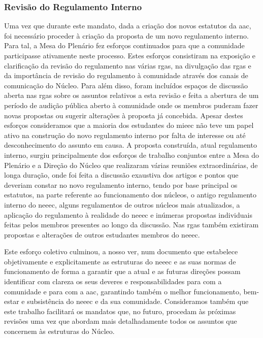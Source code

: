 
\subsubsection{Revisão do Regulamento Interno}

Uma vez que durante este mandato, dada a criação dos novos estatutos da \acrshort{aac}, foi necessário proceder à criação da proposta de um novo regulamento interno. Para tal, a Mesa do Plenário fez esforços continuados para que a comunidade participasse ativamente neste processo. Estes esforços consistiram na exposição e clarificação da revisão do regulamento nas várias \acrshort{rga}s, na divulgação das \acrshort{rga}s e da importância de revisão do regulamento à comunidade através dos canais de comunicação do Núcleo. Para além disso, foram incluídos espaços de discussão aberta nas \acrshort{rga}s sobre os assuntos relativos a esta revisão e feita a abertura de um período de audição pública aberto à comunidade onde os membros puderam fazer novas propostas ou sugerir alterações à proposta já concebida. Apesar destes esforços consideramos que a maioria dos estudantes do \acrshort{mieec} não teve um papel ativo na construção do novo regulamento interno por falta de interesse ou até desconhecimento do assunto em causa. A proposta construída, atual regulamento interno, surgiu principalmente dos esforços de trabalho conjuntos entre a Mesa do Plenário e a Direção do Núcleo que realizaram várias reuniões extraordinárias, de longa duração, onde foi feita a discussão exaustiva dos artigos e pontos que deveriam constar no novo regulamento interno, tendo por base principal os estatutos, na parte referente ao funcionamento dos núcleos, o antigo regulamento interno do \acrshort{neeec}, alguns regulamentos de outros núcleos mais atualizados, a aplicação do regulamento à realidade do \acrshort{neeec} e inúmeras propostas individuais feitas pelos membros presentes ao longo da discussão. Nas \acrshort{rga}s também existiram propostas e alterações de outros estudantes membros do \acrshort{neeec}.

Este esforço coletivo culminou, a nosso ver, num documento que estabelece objetivamente e explicitamente as estruturas do \acrshort{neeec} e as suas normas de funcionamento de forma a garantir que a atual e as futuras direções possam identificar com clareza os seus deveres e responsabilidades para com a comunidade e para com a \acrshort{aac}, garantindo também o melhor funcionamento, bem-estar e subsistência do \acrshort{neeec} e da sua comunidade. Consideramos também que este trabalho facilitará os mandatos que, no futuro, procedam às próximas revisões uma vez que abordam mais detalhadamente todos os assuntos que concernem às estruturas do Núcleo.